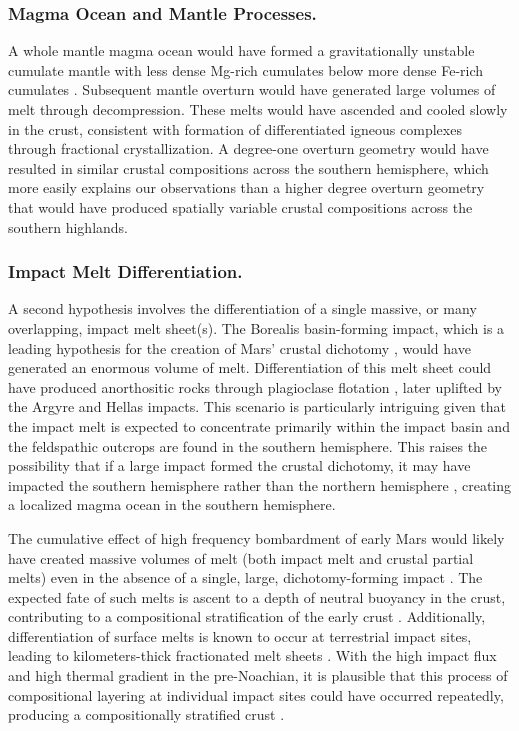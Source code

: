 \documentclass[12pt]{article}
\begin{document}
\subsubsection*{Magma Ocean and Mantle Processes.} 

A whole mantle magma ocean would have formed a gravitationally unstable cumulate mantle with less dense Mg-rich cumulates below more dense Fe-rich cumulates \citep{Elkins-Tanton2005}. Subsequent mantle overturn would have generated large volumes of melt through decompression. These melts would have ascended and cooled slowly in the crust, consistent with formation of differentiated igneous complexes through fractional crystallization. A degree-one overturn geometry \citep{Borg2003, Elkins-Tanton2005, Debaille2008} would have resulted in similar crustal compositions across the southern hemisphere, which more easily explains our observations than a higher degree overturn geometry \citep{Scheinberg2014} that would have produced spatially variable crustal compositions across the southern highlands.

\subsubsection*{Impact Melt Differentiation.} 

A second hypothesis involves the differentiation of a single massive, or many overlapping, impact melt sheet(s). The Borealis basin-forming impact, which is a leading hypothesis for the creation of Mars' crustal dichotomy \citep{Don1984, Andrews-Hanna2008, Marinova2008, Nimmo2008}, would have generated an enormous volume of melt. Differentiation of this melt sheet could have produced anorthositic rocks through plagioclase flotation \citep{Koeppel2020, Manske2021}, later uplifted by the Argyre and Hellas impacts. This scenario is particularly intriguing given that the impact melt is expected to concentrate primarily within the impact basin \citep{Marinova2008, Ballantyne2023} and the feldspathic outcrops are found in the southern hemisphere. This raises the possibility that if a large impact formed the crustal dichotomy, it may have impacted the southern hemisphere rather than the northern hemisphere \citep{Reese2010, Golabek2011, Leone2014, Ballantyne2023, Cheng2024}, creating a localized magma ocean in the southern hemisphere.

The cumulative effect of high frequency bombardment of early Mars would likely have created massive volumes of melt (both impact melt and crustal partial melts) even in the absence of a single, large, dichotomy-forming impact \citep{Koeppel2020, Manske2021, Black2024}. The expected fate of such melts is ascent to a depth of neutral buoyancy in the crust, contributing to a compositional stratification of the early crust \citep{Black2024}. Additionally, differentiation of surface melts is known to occur at terrestrial impact sites, leading to kilometers-thick fractionated melt sheets \citep{Therriault2002, OConnellCooper2011}. With the high impact flux and high thermal gradient in the pre-Noachian, it is plausible that this process of compositional layering at individual impact sites could have occurred repeatedly, producing a compositionally stratified crust \citep{Koeppel2020}.
\end{document}
